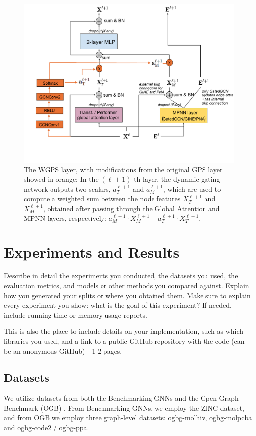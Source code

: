 \documentclass{acmart}
\begin{document}
\begin{figure}[ht]
  \centering
  \includegraphics[width=1\textwidth]{WGPS-layer}
  \caption{The WGPS layer, with modifications from the original GPS layer showed in orange: In the $({\ell}+1)$-th layer, the dynamic gating network outputs two scalars, $a_T^{{\ell}+1}$ and $a_M^{{\ell}+1}$, which are used to compute a weighted sum between the node features $X_T^{{\ell}+1}$ and $X_M^{{\ell}+1}$, obtained after passing through the Global Attention and MPNN layers, respectively: $a_M^{{\ell}+1} \cdot X_M^{{\ell}+1} + a_T^{{\ell}+1} \cdot X_T^{{\ell}+1}$.
}
  \label{fig:wgps_layer}
\end{figure}

\section{Experiments and Results}
Describe in detail the experiments you conducted, the datasets you used, the evaluation metrics, and models or other methods you compared against. Explain how you generated your splits or where you obtained them. Make sure to explain every experiment you show: what is the goal of this experiment? If needed, include running time or memory usage reports.

This is also the place to include details on your implementation, such as which libraries you used, and a link to a public GitHub repository with the code (can be an anonymous GitHub) - 1-2 pages.

\subsection{Datasets}
We utilize datasets from both the Benchmarking GNNs \cite{dwivedi2022benchmarkinggraphneuralnetworks} and the Open Graph Benchmark (OGB) \cite{hu2021opengraphbenchmarkdatasets}. From Benchmarking GNNs, we employ the ZINC dataset, and from OGB we employ three graph-level datasets: ogbg-molhiv, ogbg-molpcba and ogbg-code2 / ogbg-ppa.
\end{document}
